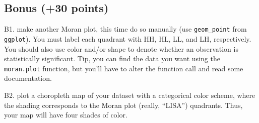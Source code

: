 \documentclass[]{article}
\begin{document}
\subsection{Bonus (+30 points)}\label{bonus-30-points}

B1. make another Moran plot, this time do so manually (use
\texttt{geom\_point} from \texttt{ggplot}). You must label each quadrant
with HH, HL, LL, and LH, respectively. You should also use color and/or
shape to denote whether an observation is statistically significant.
Tip, you can find the data you want using the \texttt{moran.plot}
function, but you'll have to alter the function call and read some
documentation.

B2. plot a choropleth map of your dataset with a categorical color
scheme, where the shading corresponds to the Moran plot (really,
``LISA'') quadrants. Thus, your map will have four shades of color.
\end{document}
